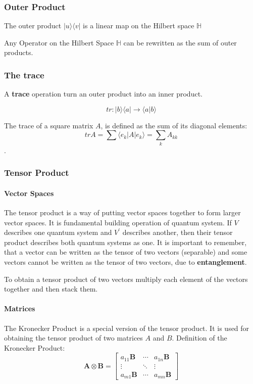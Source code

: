 \documentclass[11pt]{article}
\providecommand{\bra}[1]{\langle#1|}
\providecommand{\ket}[1]{|#1\rangle}
\providecommand{\braket}[2]{\langle#1|#2\rangle}
\providecommand{\ketbra}[2]{|#1\rangle\langle#2|}
\theoremstyle{definition}
\theoremstyle{definition}
\begin{document}
\subsubsection{Outer Product}
\label{sec:org741d54a}
The outer product \(\ketbra{u}{v}\) is a linear map on the Hilbert space \(\mathbb{H}\)

Any Operator on the Hilbert Space \(\mathbb{H}\) can be rewritten as the sum of outer products.

\subsubsection{The trace}
\label{sec:org7d7d55b}
A \textbf{trace} operation turn an outer product into an inner product.

$$tr: \ketbra{b}{a} \rightarrow \braket{a}{b}$$

The trace of a square matrix \(A\), is defined as the sum of its diagonal elements:
$$tr A = \sum{\bra{e_k}A\ket{e_k}} = \sum_k{A_{kk}}$$.


\subsubsection{Tensor Product}
\label{sec:org358aa39}
\paragraph{Vector Spaces}
\label{sec:org1381136}
The tensor product is a way of putting vector spaces together to form larger
vector spaces. It is fundamental building operation of quantum system. If
\(V\) describes one quantum system and \(V^\prime\) describes another, then
their tensor product describes both quantum systems as one. It is
important to remember, that a vector can be written as the tensor of two
vectors (separable) and some vectors cannot be written as the tensor of
two vectors, due to \textbf{entanglement}.

To obtain a tensor product of two vectors multiply each element of the
vectors together and then stack them.
\paragraph{Matrices}
\label{sec:org8c8405e}
The Kronecker Product is a special version of the tensor product. It is used for obtaining
the tensor product of two matrices \(A\) and \(B\). Definition of the Kronecker Product:
$$
     \mathbf{A}\otimes\mathbf{B} = \begin{bmatrix}
       a_{11} \mathbf{B} & \cdots & a_{1n}\mathbf{B} \\
                  \vdots & \ddots &           \vdots \\
       a_{m1} \mathbf{B} & \cdots & a_{mn} \mathbf{B}
     \end{bmatrix}
     $$
\end{document}
